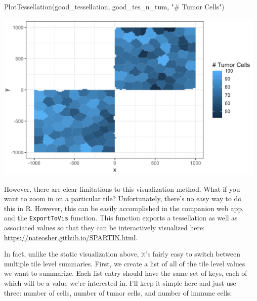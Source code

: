 \documentclass[
]{book}
\newenvironment{Shaded}{\begin{snugshade}}{\end{snugshade}}
\newcommand{\AttributeTok}[1]{\textcolor[rgb]{0.77,0.63,0.00}{#1}}
\newcommand{\ControlFlowTok}[1]{\textcolor[rgb]{0.13,0.29,0.53}{\textbf{#1}}}
\newcommand{\DecValTok}[1]{\textcolor[rgb]{0.00,0.00,0.81}{#1}}
\newcommand{\FunctionTok}[1]{\textcolor[rgb]{0.00,0.00,0.00}{#1}}
\newcommand{\NormalTok}[1]{#1}
\newcommand{\OtherTok}[1]{\textcolor[rgb]{0.56,0.35,0.01}{#1}}
\newcommand{\SpecialCharTok}[1]{\textcolor[rgb]{0.00,0.00,0.00}{#1}}
\newcommand{\StringTok}[1]{\textcolor[rgb]{0.31,0.60,0.02}{#1}}
\begin{document}
\begin{Shaded}
\begin{Highlighting}[]
\FunctionTok{PlotTessellation}\NormalTok{(good\_tessellation, good\_tes\_n\_tum, }\StringTok{"\# Tumor Cells"}\NormalTok{)}
\end{Highlighting}
\end{Shaded}

\includegraphics[width=16.89in]{Figures/Package Figs/good_heatmap}

However, there are clear limitations to this visualization method. What if you want to zoom in on a particular tile? Unfortunately, there's no easy way to do this in R. However, this can be easily accomplished in the companion web app, and the \texttt{ExportToVis} function. This function exports a tessellation as well as associated values so that they can be interactively visualized here: \url{https://nateosher.github.io/SPARTIN.html}.

In fact, unlike the static visualization above, it's fairly easy to switch between multiple tile level summaries. First, we create a list of all of the tile level values we want to summarize. Each list entry should have the same set of keys, each of which will be a value we're interested in. I'll keep it simple here and just use three: number of cells, number of tumor cells, and number of immune cells:

\begin{Shaded}
\end{Shaded}
\end{document}
